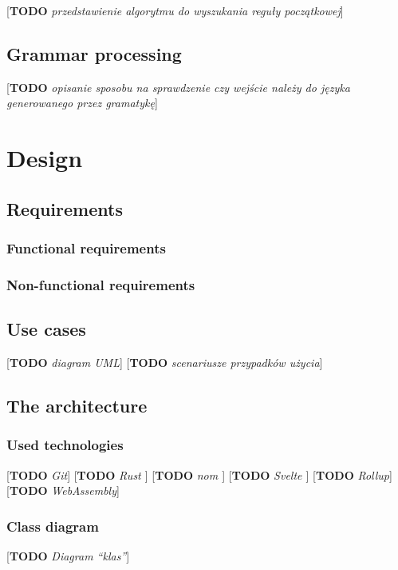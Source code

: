 \documentclass[english,engineering]{wizthesis}
\newcommand{\todo}[1]{{\color{red}[\textbf{TODO} \textit{#1}]}}
\begin{document}
\todo{przedstawienie algorytmu do wyszukania reguły początkowej}

\section{Grammar processing}

\todo{opisanie sposobu na sprawdzenie czy wejście należy do języka generowanego
przez gramatykę}

\chapter{Design}

\section{Requirements}

\subsection{Functional requirements}

\subsection{Non-functional requirements}

\section{Use cases}

\todo{diagram UML}
\todo{scenariusze przypadków użycia}

\section{The architecture}

\subsection{Used technologies}

\todo{Git}
\todo{Rust \cite{rust-book}}
\todo{nom \cite{couprie-2015}}
\todo{Svelte \cite{svelte-docs}}
\todo{Rollup}
\todo{WebAssembly}

\subsection{Class diagram}

\todo{Diagram ``klas''}
\end{document}
